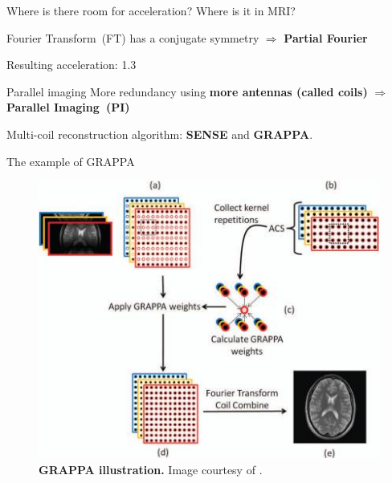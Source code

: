 \begin{frame}{Where is there room for acceleration?}
    \pause
        \hfill \break
        Where is it in MRI?

        Fourier Transform~(FT) has a conjugate symmetry $\Rightarrow$ \textbf{Partial Fourier}
        
        Resulting acceleration: 1.3
    
    
\end{frame}

\begin{frame}{Parallel imaging}
    More redundancy using \textbf{more antennas (called coils)} $\Rightarrow$ \textbf{Parallel Imaging~(PI)}
     
    Multi-coil reconstruction algorithm: \textbf{SENSE} and \textbf{GRAPPA}.
\end{frame}

\begin{frame}{The example of GRAPPA}
    \begin{figure}
        \centering
        \includegraphics[height=0.6\textheight]{Figures/intro_figures/GRAPPA.jpeg}
        \caption{\label{fig:GRAPPA}\textbf{GRAPPA illustration.} Image courtesy of \citet{deshmane2012parallel}.
        }
    \end{figure} 
\end{frame}

